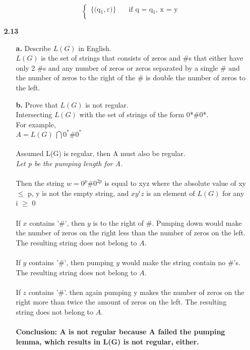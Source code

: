 \documentclass[12pt]{letter}
\newcommand\tab[1][2cm]{\hspace*{#1}}
\begin{document}
\begin{enumerate}
\begin{enumerate}
\[\begin{cases}
	\text{\{(q$_{1},\varepsilon$)\}} 
	&\quad\text{if q = q$_{1}$, x = y}\\ 
	\end{cases}
	\]	
\end{enumerate}

\newpage
\item[\textbf{2.13}]
\begin{enumerate}
	\begin{enumerate}
	\item[\textbf{a.}] Describe $L(G)$ in English. \\
	$L(G)$ is the set of strings that consists of zeros and \#s that either have only 2 \#s and any number of zeros or zeros separated by a single \# and the number of zeros to the right of the \# is double the number of zeros to the left. \\

	\item[\textbf{b.}] Prove that $L(G)$ is not regular. \\
	Intersecting $L(G)$ with the set of strings of the form 0*\#0*. \\
	For example,
	\leavevmode \\
	\tab $A= L(G)\ \bigcap 0^*\#0^*$\\
	\leavevmode \\
	Assumed L(G) is regular, then A must also be regular. \\

	\tab \textit{Let p be the pumping length for A.} \\ 
	\leavevmode \\
	Then the string $w=0^p\#0^{2p}$ is equal to xyz where the absolute value of xy $\leq $ p, y is not the empty string, and $ xy^{i}z $ is an element of $L(G)$ for any i $ \geq $ 0  \\
	\leavevmode \\
	If $x$ contains '\#', then $y$ is to the right of \#. Pumping down would make the number of zeros on the right less than the number of zeros on the left. The resulting string does not belong to $A$. \\
	\leavevmode \\
	If $y$ contains '\#', then pumping $y$ would make the string contain no \#'s. The resulting string does not belong to $A$. \\
	\leavevmode \\
	If $z$ contains '\#'. then again pumping y makes the number of zeros on the right more than twice the amount of zeros on the left. The resulting string does not belong to $A$. \\
	\leavevmode \\
	\textbf{Conclusion: A is not regular because A failed the pumping lemma, which results in L(G) is not regular, either.} \\
	\end{enumerate}
\end{enumerate}


\end{enumerate}
\end{document}
